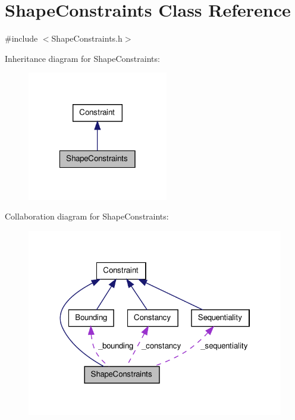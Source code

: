 \hypertarget{classShapeConstraints}{\section{\-Shape\-Constraints \-Class \-Reference}
\label{classShapeConstraints}
}


{\ttfamily \#include $<$\-Shape\-Constraints.\-h$>$}



\-Inheritance diagram for \-Shape\-Constraints\-:\nopagebreak
\begin{figure}[H]
\begin{center}
\leavevmode
\includegraphics[width=174pt]{classShapeConstraints__inherit__graph}
\end{center}
\end{figure}


\-Collaboration diagram for \-Shape\-Constraints\-:\nopagebreak
\begin{figure}[H]
\begin{center}
\leavevmode
\includegraphics[width=320pt]{classShapeConstraints__coll__graph}
\end{center}
\end{figure}
